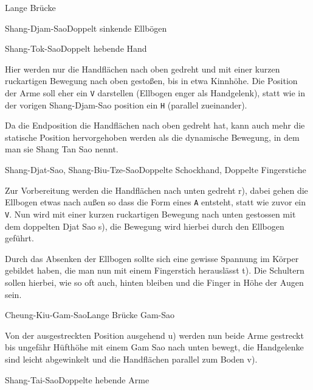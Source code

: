 \begin{WTSatz}{Lange Br\"ucke}
\begin{WTSatzTeil}{Shang-Djam-Sao}{Doppelt sinkende Ellb\"ogen}
	\end{WTSatzTeil}
	
	\def\WTFormenSNTLetter#1{\texttt{#1}}
	
	\begin{WTSatzTeil}{Shang-Tok-Sao}{Doppelt hebende Hand}
		
		Hier werden nur die Handfl\"achen nach oben gedreht und mit einer kurzen ruckartigen Bewegung nach oben gesto{\ss}en, bis in etwa Kinnh\"ohe. Die Position der Arme soll eher ein \WTFormenSNTLetter{V} darstellen (Ellbogen enger als Handgelenk), statt wie in der vorigen Shang-Djam-Sao position ein \WTFormenSNTLetter{H} (parallel zueinander).
		
		Da die Endposition die Handfl\"achen nach oben gedreht hat, kann auch mehr die statische Position hervorgehoben werden als die dynamische Bewegung, in dem man sie Shang Tan Sao nennt.
		
	\end{WTSatzTeil}
	\begin{WTSatzTeil}{Shang-Djat-Sao, Shang-Biu-Tze-Sao}{Doppelte Schockhand, Doppelte Fingerstiche}
		
		Zur Vorbereitung werden die Handfl\"achen nach unten gedreht r), dabei gehen die Ellbogen etwas nach au{\ss}en so dass die Form eines \WTFormenSNTLetter{A} entsteht, statt wie zuvor ein \WTFormenSNTLetter{V}. Nun wird mit einer kurzen ruckartigen Bewegung nach unten gestossen mit dem doppelten Djat Sao s), die Bewegung wird hierbei durch den Ellbogen gef\"uhrt.
		
		Durch das Absenken der Ellbogen sollte sich eine gewisse Spannung im K\"orper gebildet haben, die man nun mit einem Fingerstich herausl\"asst t). Die Schultern sollen hierbei, wie so oft auch, hinten bleiben und die Finger in H\"ohe der Augen sein.
		
	\end{WTSatzTeil}
	\begin{WTSatzTeil}{Cheung-Kiu-Gam-Sao}{Lange Br\"ucke Gam-Sao}
		
		Von der ausgestreckten Position ausgehend u) werden nun beide Arme gestreckt bis ungef\"ahr H\"ufth\"ohe mit einem Gam Sao nach unten bewegt, die Handgelenke sind leicht abgewinkelt und die Handfl\"achen parallel zum Boden v).
		
	\end{WTSatzTeil}
	\begin{WTSatzTeil}{Shang-Tai-Sao}{Doppelte hebende Arme}
		

\end{WTSatzTeil}
\end{WTSatz}
